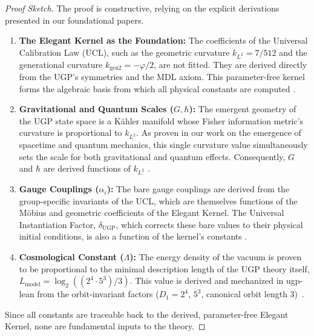 \documentclass[12pt]{article}
\newcommand{\UGP}{\text{UGP}}
\begin{document}
\begin{proof}[Proof Sketch]
The proof is constructive, relying on the explicit derivations presented in our foundational papers.
\begin{enumerate}[leftmargin=*, itemsep=0.2em]
    \item \textbf{The Elegant Kernel as the Foundation:} The coefficients of the Universal Calibration Law (UCL), such as the geometric curvature $k_{L^2}=7/512$ and the generational curvature $k_{\text{gen2}}=-\varphi/2$, are not fitted. They are derived directly from the UGP's symmetries and the MDL axiom. This parameter-free kernel forms the algebraic basis from which all physical constants are computed \cite{Spivack2025_UGPMathFoundations}.
    \item \textbf{Gravitational and Quantum Scales ($G, \hbar$):} The emergent geometry of the UGP state space is a Kähler manifold whose Fisher information metric's curvature is proportional to $k_{L^2}$. As proven in our work on the emergence of spacetime and quantum mechanics, this single curvature value simultaneously sets the scale for both gravitational and quantum effects. Consequently, $G$ and $\hbar$ are derived functions of $k_{L^2}$ \cite{Spivack2025UGP}.
    \item \textbf{Gauge Couplings ($\alpha_i$):} The bare gauge couplings are derived from the group-specific invariants of the UCL, which are themselves functions of the Möbius and geometric coefficients of the Elegant Kernel. The Universal Instantiation Factor, $\delta_{\UGP}$, which corrects these bare values to their physical initial conditions, is also a function of the kernel's constants \cite{Spivack2025_UGPMathFoundations}.
    \item \textbf{Cosmological Constant ($\Lambda$):} The energy density of the vacuum is proven to be proportional to the minimal description length of the UGP theory itself, $L_{\text{model}} = \log_2((2^4 \cdot 5^3)/3)$. This value is derived and mechanized in ugp-lean from the orbit-invariant factors ($D_1=2^4$, $5^3$, canonical orbit length 3)~\cite{SpivackUGPFormalization,ugp-lean}.
\end{enumerate}
Since all constants are traceable back to the derived, parameter-free Elegant Kernel, none are fundamental inputs to the theory. \qedhere
\end{proof}
\end{document}

